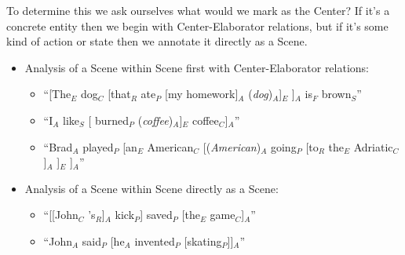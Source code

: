 \documentclass[11pt]{article}
\newcommand{\be}{\begin{enumerate}}
\newcommand{\ee}{\end{enumerate}}
\newcommand{\orig}[1]{{\color{red} {#1}}}
\newcommand{\dcom}[1]{\textit{\color{blue}{#1}}}
\newcommand{\rem}[1]{{(\it #1})}
\begin{document}
To determine this we ask ourselves what would we mark as the Center? If it's a concrete entity then we begin with Center-Elaborator relations, but if it's some kind of action or state then we annotate it directly as a Scene.

\begin{itemize}
\item Analysis of a Scene within Scene first with Center-Elaborator relations: 
\begin{itemize}
\item
``[The$_E$ dog$_C$ [that$_R$ ate$_P$ [my homework]$_A$ \rem{dog}$_A$]$_E$ ]$_A$ is$_F$ brown$_S$''
\item
``I$_A$ like$_S$ [ burned$_P$ \rem{coffee}$_A$]$_E$ coffee$_C$]$_A$''
\item
``Brad$_A$ played$_P$ [an$_E$ American$_C$ [\rem{American}$_A$ going$_P$ [to$_R$ the$_E$ Adriatic$_C$ ]$_A$ ]$_E$ ]$_A$''
\end{itemize}

\item Analysis of a Scene within Scene directly as a Scene: 

\begin{itemize}
\item 
``[[John$_C$ 's$_R$]$_A$ kick$_P$] saved$_P$ [the$_E$ game$_C$]$_A$'' 
\item
``John$_A$ said$_P$ [he$_A$ invented$_P$ [skating$_P$]]$_A$'' 
\end{itemize}

\end{itemize}



\end{document}
